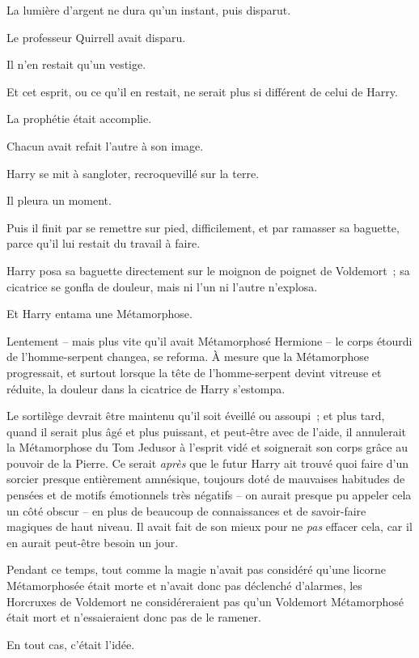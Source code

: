 La lumière d'argent ne dura qu'un instant, puis disparut.

Le professeur Quirrell avait disparu.

Il n'en restait qu'un vestige.

Et cet esprit, ou ce qu'il en restait, ne serait plus si différent de celui de Harry.

La prophétie était accomplie.

Chacun avait refait l'autre à son image.

Harry se mit à sangloter, recroquevillé sur la terre.

Il pleura un moment.

Puis il finit par se remettre sur pied, difficilement, et par ramasser sa baguette, parce qu'il lui restait du travail à faire.

\later

Harry posa sa baguette directement sur le moignon de poignet de Voldemort~; sa cicatrice se gonfla de douleur, mais ni l'un ni l'autre n'explosa.

Et Harry entama une Métamorphose.

Lentement -- mais plus vite qu'il avait Métamorphosé Hermione -- le corps étourdi de l'homme-serpent changea, se reforma. À mesure que la Métamorphose progressait, et surtout lorsque la tête de l'homme-serpent devint vitreuse et réduite, la douleur dans la cicatrice de Harry s'estompa.

Le sortilège devrait être maintenu qu'il soit éveillé ou assoupi~; et plus tard, quand il serait plus âgé et plus puissant, et peut-être avec de l'aide, il annulerait la Métamorphose du Tom Jedusor à l'esprit vidé et soignerait son corps grâce au pouvoir de la Pierre. Ce serait \emph{après} que le futur Harry ait trouvé quoi faire d'un sorcier presque entièrement amnésique, toujours doté de mauvaises habitudes de pensées et de motifs émotionnels très négatifs -- on aurait presque pu appeler cela un côté obscur -- en plus de beaucoup de connaissances et de savoir-faire magiques de haut niveau. Il avait fait de son mieux pour ne \emph{pas} effacer cela, car il en aurait peut-être besoin un jour.

Pendant ce temps, tout comme la magie n'avait pas considéré qu'une licorne Métamorphosée était morte et n'avait donc pas déclenché d'alarmes, les Horcruxes de Voldemort ne considéreraient pas qu'un Voldemort Métamorphosé était mort et n'essaieraient donc pas de le ramener.

En tout cas, c'était l'idée.

